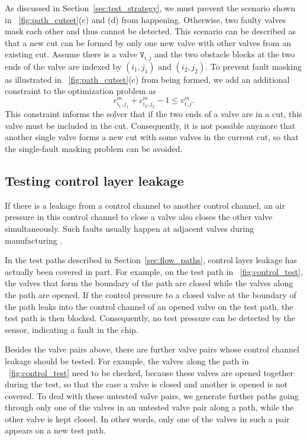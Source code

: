 \documentclass[journal,twoside]{IEEEtran}
\begin{document}
  
As discussed in Section~\ref{sec:test_strategy}, we must prevent the
scenario shown in \figname~\ref{fig:path_cutset}(c) and (d) from happening.
 Otherwise, two faulty valves mask each other and thus 
cannot be detected.  This scenario can be described as that a new
cut can be formed by only one new valve with other valves from an existing 
cut.  Assume there is a valve $\mathtt{V}_{i,j}$ and
the two obstacle blocks at the two ends of the valve are indexed by $(i_1,j_1)$ and
$(i_2,j_2)$.  To prevent fault masking as illustrated in \figname~\ref{fig:path_cutset}(c)
from being formed, we add an additional constraint to the optimization problem
as 
\begin{equation}
c^m_{i_1,j_1}+c^m_{i_2,j_2}-1\le v^m_{i,j}.
\end{equation}
This constraint informs the solver that if the two ends of a valve are in 
a cut, this valve must be included in the cut. 
Consequently, it is not possible anymore that another single valve forms a new cut
with some valves in the current cut, so that the single-fault masking problem
can be avoided. 

\subsection{Testing control layer leakage}
\label{sec:control_layer_test}

If there is a leakage from a control channel to another control channel,
an air pressure in this control channel 
to close a valve also closes the other valve simultaneously. 
Such faults usually happen at adjacent valves during manufacturing
\cite{HuYHC14}.

In the test paths described in Section~\ref{sec:flow_paths}, 
control layer leakage has actually been covered in part. For example, 
on the test path in \figname~\ref{fig:control_test}, the valves that
form the boundary of the path are closed while the valves along the path are
opened. If the control pressure to a closed valve at the boundary of the path 
leaks into the control channel of an opened valve on the test path, 
the test path is then blocked. Consequently, no test pressure 
can be detected by the sensor, indicating a fault in the chip. 

Besides the valve pairs above, there are further valve pairs whose control channel
leakage should be tested. For example, the valves 
along the path in \figname~\ref{fig:control_test} need to be checked,
because these valves are opened together during the test, so that the case a
valve is closed and another is opened is not covered. To deal with these
untested valve pairs, we generate further paths going through only one of the valves
in an untested valve pair along a path, while the other valve is kept closed. 
In other words, only one of the valves in such a pair appears on a new test path. 
\end{document}
